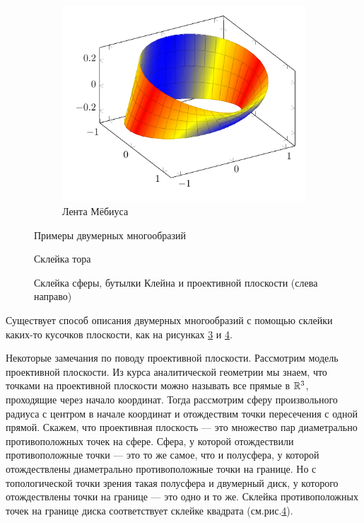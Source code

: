 \begin{figure}[htbp]
\begin{subfigure}[b]{0.48\textwidth}
        \includegraphics[scale=0.8]{images/c9.3.pdf}
        \caption{Лента Мёбиуса}
        \label{fig:mobius}
    \end{subfigure}
    \caption{Примеры двумерных многообразий}
    \label{fig:trio}
\end{figure}


\begin{figure}[htbp]
    \centering
    \caption{Склейка тора}
    \label{fig:c9.5}
\end{figure}

\begin{figure}[htbp]
    \centering
    \caption{Склейка сферы, бутылки Клейна и проективной плоскости (слева направо)}
    \label{fig:c9.6}
\end{figure}

Существует способ описания двумерных многообразий с помощью склейки каких-то кусочков плоскости, как на рисунках \ref{fig:c9.5} и \ref{fig:c9.6}.

Некоторые замечания по поводу проективной плоскости. Рассмотрим модель проективной плоскости. Из курса аналитической геометрии мы знаем, что точками на проективной плоскости можно называть все прямые в $\mathbb{R}^3$, проходящие через начало координат. Тогда рассмотрим сферу произвольного радиуса с центром в начале координат и отождествим точки пересечения с одной прямой. Скажем, что проективная плоскость — это множество пар диаметрально противоположных точек на сфере. Сфера, у которой отождествили противоположные точки — это то же самое, что и полусфера, у которой отождествлены диаметрально противоположные точки на границе. Но с топологической точки зрения такая полусфера и двумерный диск, у которого отождествлены точки на границе — это одно и то же. Склейка противоположных точек на границе диска соответствует склейке квадрата (см.рис.\ref{fig:c9.6}).


